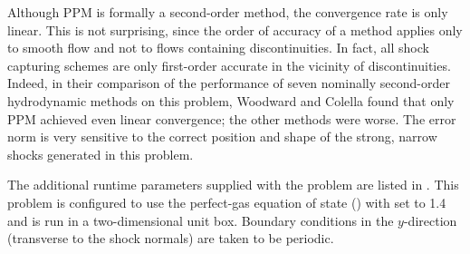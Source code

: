 Although PPM is formally a second-order method, the convergence rate is
only linear. This is not surprising, since the order of accuracy of a method
applies only to smooth flow and not to flows containing discontinuities.
In fact, all shock capturing schemes are only first-order accurate in the
vicinity of discontinuities.  Indeed, in their comparison of the performance
of seven nominally second-order hydrodynamic
methods on this problem, Woodward and Colella found that only PPM achieved
even linear convergence; the other methods were worse. The error norm
is very sensitive to the correct position and shape of the strong, narrow
shocks generated in this problem.

The additional runtime parameters supplied with the 
problem are listed in . This problem is
configured to use the perfect-gas equation of state ()
with  set to 1.4 and is run in a two-dimensional unit
box. Boundary conditions in the $y$-direction (transverse to the
shock normals) are taken to be periodic.

\vfill
\eject

